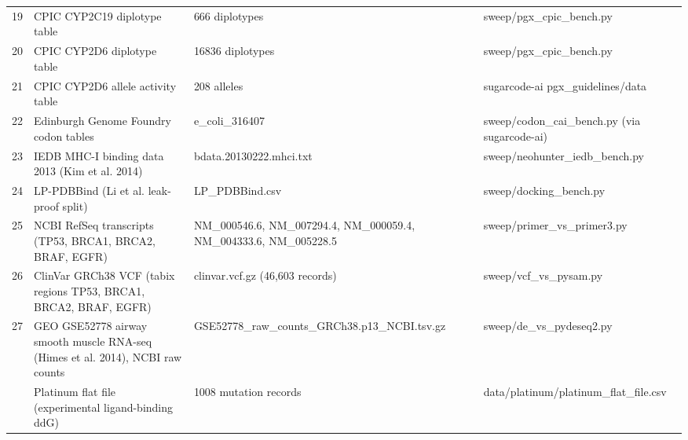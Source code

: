 \begin{center}
\begin{tabular}{rp{4.2cm}p{3.6cm}p{5cm}}
19 & CPIC CYP2C19 diplotype table & 666 diplotypes & sweep/pgx\_cpic\_bench.py\\
20 & CPIC CYP2D6 diplotype table & 16836 diplotypes & sweep/pgx\_cpic\_bench.py\\
21 & CPIC CYP2D6 allele activity table & 208 alleles & sugarcode-ai pgx\_guidelines/data\\
22 & Edinburgh Genome Foundry codon tables & e\_coli\_316407 & sweep/codon\_cai\_bench.py (via sugarcode-ai)\\
23 & IEDB MHC-I binding data 2013 (Kim et al. 2014) & bdata.20130222.mhci.txt & sweep/neohunter\_iedb\_bench.py\\
24 & LP-PDBBind (Li et al. leak-proof split) & LP\_PDBBind.csv & sweep/docking\_bench.py\\
25 & NCBI RefSeq transcripts (TP53, BRCA1, BRCA2, BRAF, EGFR) & NM\_000546.6, NM\_007294.4, NM\_000059.4, NM\_004333.6, NM\_005228.5 & sweep/primer\_vs\_primer3.py\\
26 & ClinVar GRCh38 VCF (tabix regions TP53, BRCA1, BRCA2, BRAF, EGFR) & clinvar.vcf.gz (46,603 records) & sweep/vcf\_vs\_pysam.py\\
27 & GEO GSE52778 airway smooth muscle RNA-seq (Himes et al. 2014), NCBI raw counts & GSE52778\_raw\_counts\_GRCh38.p13\_NCBI.tsv.gz & sweep/de\_vs\_pydeseq2.py\\
 & Platinum flat file (experimental ligand-binding ddG) & 1008 mutation records & data/platinum/platinum\_flat\_file.csv\\
\hline\end{tabular}\end{center}
